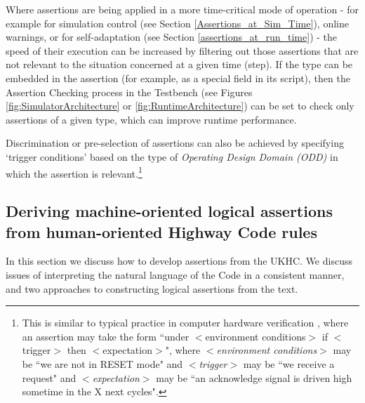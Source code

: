 Where assertions are being applied in a more time-critical mode of operation - for example for simulation control (see Section \ref{Assertions_at_Sim_Time}), online warnings, or for self-adaptation (see Section \ref{assertions_at_run_time}) - the speed of their execution can be increased by filtering out those assertions that are not relevant to the situation concerned at a given time (step). If the type can be embedded in the assertion (for example, as a special field in its script), then the Assertion Checking process in the Testbench (see Figures \ref{fig:SimulatorArchitecture} or \ref{fig:RuntimeArchitecture}) can be set to check only assertions of a given type, which can improve runtime performance.

Discrimination or pre-selection of assertions can also be achieved by specifying `trigger conditions' based on the type of \textit{Operating Design Domain (ODD)} in which the assertion is relevant.\footnote{This is similar to typical practice in computer hardware verification \cite{tao2009}, where an assertion may take the form ``under $<$environment conditions$>$ if $<$trigger$>$ then $<$expectation$>$", where \textit{$<$environment conditions$>$} may be ``we are not in RESET mode" and \textit{$<$trigger$>$} may be ``we receive a request" and \textit{$<$expectation$>$}  may be ``an acknowledge signal is driven high sometime in the X next cycles".} 


\subsection{Deriving machine-oriented logical assertions from human-oriented Highway Code rules}
In this section we discuss how to develop assertions from the UKHC. We discuss issues of interpreting the natural language of the Code in a consistent manner, and two approaches to constructing logical assertions from the text. 

